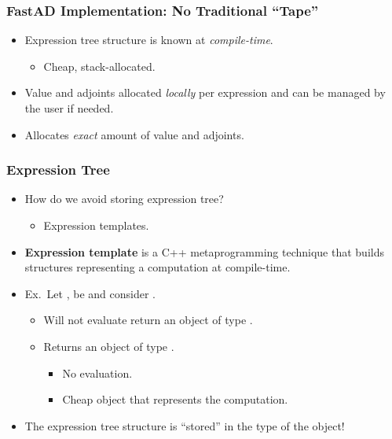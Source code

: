 \begin{frame}
\frametitle{FastAD Implementation: No Traditional ``Tape''}

\begin{itemize}
    
\item Expression tree structure is known at \emph{compile-time}.
    \begin{itemize}
        \item Cheap, stack-allocated.
    \end{itemize}

\item Value and adjoints allocated \emph{locally} per expression
    and can be managed by the user if needed.

\item Allocates \emph{exact} amount of value and adjoints.

\end{itemize}
\end{frame}

\begin{frame}
\frametitle{Expression Tree}
\begin{itemize}

\item How do we avoid storing expression tree?
    \begin{itemize}
        \item Expression templates.
    \end{itemize}

\item \textbf{Expression template} is a C++ metaprogramming technique
    that builds structures representing a computation at compile-time.

\item Ex.\ Let ,  be 
    and consider .
    \begin{itemize}
        \item Will not evaluate return an object of type .
        \item Returns an object of type .
            \begin{itemize}
                \item No evaluation.
                \item Cheap object that represents the computation.
            \end{itemize}
    \end{itemize}

\item The expression tree structure is ``stored'' in the type of the object!

\end{itemize}
\end{frame}

